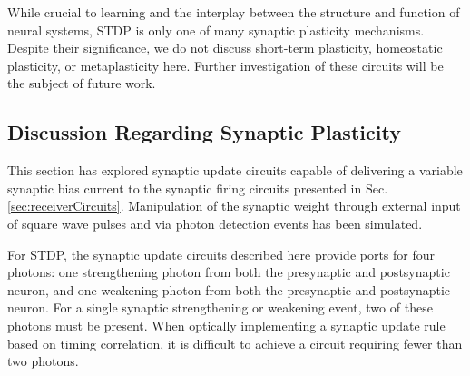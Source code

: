 \documentclass[twocolumn]{article}
\begin{document}
While crucial to learning and the interplay between the structure and function of neural systems, STDP is only one of many synaptic plasticity mechanisms. Despite their significance, we do not discuss short-term plasticity, homeostatic plasticity, or metaplasticity here. Further investigation of these circuits will be the subject of future work.
	
\subsection{\label{sec:discussion_synapticPlasticity}Discussion Regarding Synaptic Plasticity}
This section has explored synaptic update circuits capable of delivering a variable synaptic bias current to the synaptic firing circuits presented in Sec.\,\ref{sec:receiverCircuits}. Manipulation of the synaptic weight through external input of square wave pulses and via photon detection events has been simulated. 

For STDP, the synaptic update circuits described here provide ports for four photons: one strengthening photon from both the pre\textendash synaptic and post\textendash synaptic neuron, and one weakening photon from both the pre\textendash synaptic and post\textendash synaptic neuron. For a single synaptic strengthening or weakening event, two of these photons must be present. When optically implementing a synaptic update rule based on timing correlation, it is difficult to achieve a circuit requiring fewer than two photons.
\end{document}
